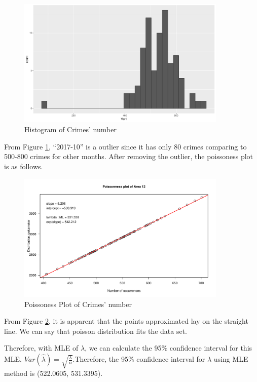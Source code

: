 \documentclass[UTF8]{article}
\begin{document}
\begin{figure}[htb]
    \includegraphics[width=10cm,height=6.18cm]{../image/4.pdf}
    \caption{Histogram of Crimes' number}\label{fig:outliar} 
\end{figure}


From Figure \ref{fig:outliar}, “2017-10” is a outlier since it has only 80 crimes comparing to 500-800 crimes for other months. After removing the outlier, the poissoness plot is as follows.




\begin{figure}[]
    \includegraphics[width=10cm,height=6.18cm]{../image/5.pdf}
    \caption{Poissoness Plot of Crimes' number}\label{fig:poisson_Crime_number} 
\end{figure}

\newpage

From Figure \ref{fig:poisson_Crime_number}, it is apparent that the points approximated lay on the straight line. We can say that poisson distribution fits the data set.

Therefore, with MLE of $\lambda$, we can calculate the 95\% confidence interval for this MLE. $Var(\hat{\lambda})=\sqrt{\frac{\lambda}{n}}$.Therefore, the 95\% confidence interval for $\lambda$ using MLE method is (522.0605, 531.3395). 
\end{document}
